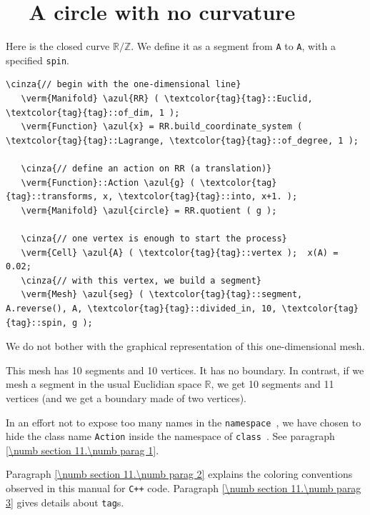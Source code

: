 \section{~~A circle with no curvature}\label{\numb section 7.\numb parag 1}

Here is the closed curve $ \mathbb{R}/{\mathbb Z} $.
We define it as a segment from {\small\tt A} to {\small\tt A}, with a specified {\small\tt spin}.

\begin{Verbatim}[commandchars=\\\{\},formatcom=\small\tt,frame=single,
   label=parag-\ref{\numb section 7.\numb parag 2}.cpp,rulecolor=\color{coment},
   baselinestretch=0.94,framesep=2mm                                            ]
   \cinza{// begin with the one-dimensional line}
   \verm{Manifold} \azul{RR} ( \textcolor{tag}{tag}::Euclid, \textcolor{tag}{tag}::of_dim, 1 );
   \verm{Function} \azul{x} = RR.build_coordinate_system ( \textcolor{tag}{tag}::Lagrange, \textcolor{tag}{tag}::of_degree, 1 );

   \cinza{// define an action on RR (a translation)}
   \verm{Function}::Action \azul{g} ( \textcolor{tag}{tag}::transforms, x, \textcolor{tag}{tag}::into, x+1. );
   \verm{Manifold} \azul{circle} = RR.quotient ( g );

   \cinza{// one vertex is enough to start the process}
   \verm{Cell} \azul{A} ( \textcolor{tag}{tag}::vertex );  x(A) = 0.02;
   \cinza{// with this vertex, we build a segment}
   \verm{Mesh} \azul{seg} ( \textcolor{tag}{tag}::segment, A.reverse(), A, \textcolor{tag}{tag}::divided_in, 10, \textcolor{tag}{tag}::spin, g );
\end{Verbatim}

We do not bother with the graphical representation of this one-dimensional mesh.

This mesh has 10 segments and 10 vertices. It has no boundary.
In contrast, if we mesh a segment in the usual Euclidian space $ \mathbb{R} $,
we get 10 segments and 11 vertices (and we get a boundary made of two vertices).

In an effort not to expose too many names in the {\small\tt namespace },
we have chosen to hide the class name {\small\tt Action} inside the namespace of
{\small\tt class }.
See paragraph \ref{\numb section 11.\numb parag 1}.

Paragraph \ref{\numb section 11.\numb parag 2} explains the coloring conventions observed
in this manual for {\tt C++} code.
Paragraph \ref{\numb section 11.\numb parag 3} gives details about
{\small\tt\textcolor{tag}{tag}}s.


